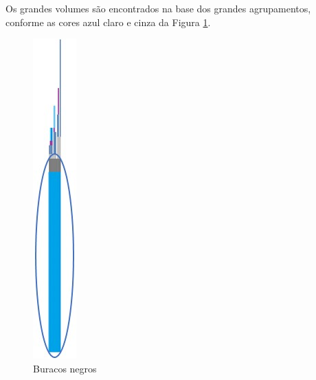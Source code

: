 Os grandes volumes são encontrados na base dos grandes agrupamentos, conforme as cores azul claro e cinza da Figura \ref{fig:consciousness_black_hole}.
\begin{figure}[H]
\caption{Buracos negros}
\label{fig:consciousness_black_hole}
\centering
\includegraphics[scale=.6]{sections/images/consciousness_black_hole.jpg}
\end{figure}
